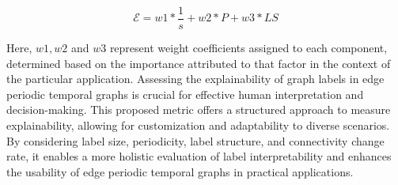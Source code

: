 \[
\mathcal{E} = w1 * \frac{1}{s} + w2 * P + w3 * LS
\]

Here, $w1, w2$ and $w3$ represent weight coefficients assigned to each component, determined based on the importance attributed to that factor in the context of the particular application. Assessing the explainability of graph labels in edge periodic temporal graphs is crucial for effective human interpretation and decision-making. This proposed metric offers a structured approach to measure explainability, allowing for customization and adaptability to diverse scenarios. By considering label size, periodicity, label structure, and connectivity change rate, it enables a more holistic evaluation of label interpretability and enhances the usability of edge periodic temporal graphs in practical applications.